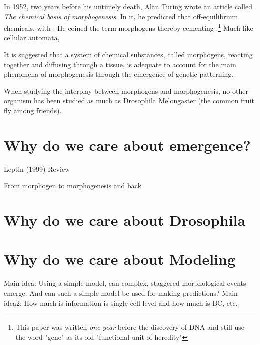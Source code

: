 In 1952, two years before his untimely death, Alan Turing wrote an article called
\textit{The chemical basis of morphogenesis}.\cite{turing52the} In it, he predicted that off-equilibrium chemicals, with . He coined the term morphogens thereby cementing .\footnote{This paper was written \textit{one year} before the discovery of DNA and still use the word "gene" as its old "functional unit of heredity"} Much like cellular automata, 



It is suggested that a system of chemical substances, called morphogens, reacting together and diffusing through a tissue, is adequate to account for the main phenomena of morphogenesis through the emergence of genetic patterning.

When studying the interplay between morphogens and morphogenesis, no other organism has been studied as much as Drosophila Melongaster (the common fruit fly among friends).



\section{Why do we care about emergence?}
Leptin (1999) Review

From morphogen to morphogenesis and back
\section{Why do we care about Drosophila}
\section{Why do we care about Modeling}
Main idea: Using a simple model, can complex, staggered morphological events emerge. And can such a simple model be used for making predictions?
Main idea2: How much is information is single-cell level and how much is BC, etc.